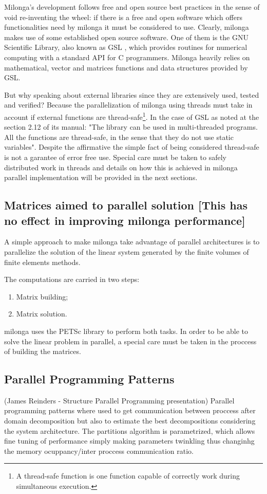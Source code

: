 \documentclass[review]{elsarticle}
\begin{document}
Milonga's development follows free and open source best practices in the sense of void re-inventing the wheel:
if there is a free and open software which offers functionalities need by milonga it must be considered to use.
Clearly, milonga makes use of some established open source software. One of them is the GNU Scientific Library, also
known as GSL \cite{gsl2016}, which provides routines for numerical computing with a standard API for C
programmers. Milonga heavily relies on mathematical, vector and matrices functions and data structures provided
by GSL.

But why speaking about external libraries since they are extensively used, tested and verified? Because
the parallelization of milonga using threads must take in account if external functions are
thread-safe\footnote{A thread-safe function is one function capable of correctly work during simultaneous
  execution.}. In the case of GSL as noted at the section 2.12 of its manual: "The library can be used in multi-threaded programs. All the functions are thread-safe, in the sense that they do not use static variables". Despite the affirmative the
simple fact of being considered thread-safe is not a garantee of error free use. Special care must be taken to safely
distributed work in threads and details on how this is achieved in milonga parallel implementation will be provided
in the next sections.

\subsection{Matrices aimed to parallel solution [This has no effect in improving milonga performance]}
A simple approach to make milonga take advantage of parallel architectures is to parallelize the
solution of the linear system generated by the finite volumes of finite elements methods.

The computations are carried in two steps:
\begin{enumerate}
\item Matrix building;
  \item Matrix solution.
\end{enumerate}

milonga uses the PETSc library to perform both tasks. In order to be able to solve the linear problem
in parallel, a special care must be taken in the proccess of building the matrices.


\subsection{Parallel Programming Patterns}
(James Reinders - Structure Parallel Programming presentation)
Parallel programming patterns where used to get communication between proccess after
domain decomposition but also to estimate the best decompositions considering the system
architecture. The partitions algorithm is parametrized, which allows fine tuning of performance
simply making parameters twinkling thus changinhg the memory ocuppancy/inter proccess communication ratio.
\end{document}
